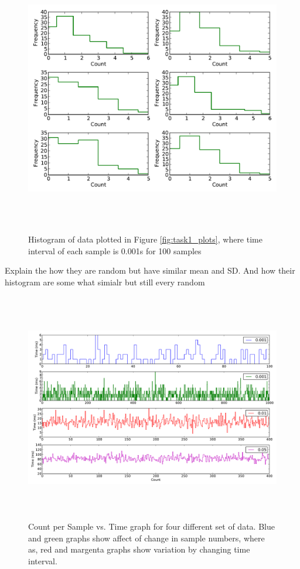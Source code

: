 \documentclass[a4paper,12pt]{article}
\begin{document}
\begin{figure}[H]
\centering
\includegraphics[angle=0,height=12cm,width=15.5cm]{graphs/task1_hist.pdf}
\caption{Histogram of data plotted in Figure \ref{fig:task1_plots}, where time interval of each sample is 0.001s for 100 samples }
\label{fig:task1_hist}
\end{figure}
Explain the how they are random but have similar mean and SD. And how their histogram are some what simialr but still every random
\begin{figure}[H]
\centering
\includegraphics[angle=0,height=10cm,width=15.5cm]{graphs/diff_plots.pdf}
\caption{Count per Sample vs. Time graph for four different set of data. Blue and green graphs show affect of change in sample numbers, where as, red and margenta graphs show variation by changing time interval.}
\label{fig:diff_plot}
\end{figure}
\end{document}
